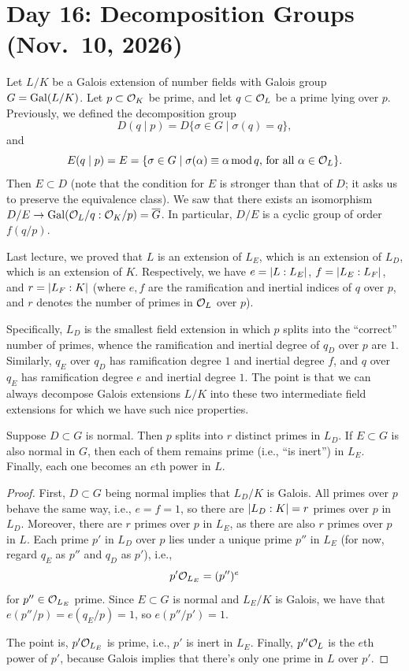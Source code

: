 \section{Day 16: Decomposition Groups (Nov.\ 10, 2026)}
Let $L/K$ be a Galois extension of number fields with Galois group $G = \operatorname{Gal}(L/K)$. Let $p \subset \mathcal O_K$ be prime, and let $q \subset \mathcal O_L$ be a prime lying over $p$. Previously, we defined the decomposition group
\[ D(q \mid p) = D \{\sigma \in G \mid \sigma(q) = q\}, \]
and
\[ E(q \mid p) = E = \{\sigma \in G \mid \sigma(\alpha) \equiv \alpha \operatorname{mod}{q} \text{, for all $\alpha \in \mathcal O_L$}\}. \]
Then $E \subset D$ (note that the condition for $E$ is stronger than that of $D$; it asks us to preserve the equivalence class). We saw that there exists an isomorphism $D/E \to \operatorname{Gal}(\mathcal O_L/q : \mathcal O_K/p) = \overline G$. In particular, $D/E$ is a cyclic group of order $f(q/p)$.

Last lecture, we proved that $L$ is an extension of $L_E$, which is an extension of $L_D$, which is an extension of $K$. Respectively, we have $e = \left\lvert L : L_E \right\rvert$, $f = \left\lvert L_E : L_F \right\rvert$, and $r = \left\lvert L_F : K \right\rvert$ (where $e, f$ are the ramification and inertial indices of $q$ over $p$, and $r$ denotes the number of primes in $\mathcal O_L$ over $p$).

Specifically, $L_D$ is the smallest field extension in which $p$ splits into the ``correct'' number of primes, whence the ramification and inertial degree of $q_D$ over $p$ are $1$. Similarly, $q_E$ over $q_D$ has ramification degree $1$ and inertial degree $f$, and $q$ over $q_E$ has ramification degree $e$ and inertial degree $1$. The point is that we can always decompose Galois extensions $L/K$ into these two intermediate field extensions for which we have such nice properties.

\begin{corollary} \label{cor:splitting_inert_primes}
    Suppose $D \subset G$ is normal. Then $p$ splits into $r$ distinct primes in $L_D$. If $E \subset G$ is also normal in $G$, then each of them remains prime (i.e., ``is inert'') in $L_E$. Finally, each one becomes an $e$th power in $L$.
\end{corollary}
\begin{proof}
    First, $D \subset G$ being normal implies that $L_D / K$ is Galois. All primes over $p$ behave the same way, i.e., $e = f = 1$, so there are $\left\lvert L_D : K \right\rvert = r$ primes over $p$ in $L_D$. Moreover, there are $r$ primes over $p$ in $L_E$, as there are also $r$ primes over $p$ in $L$. Each prime $p'$ in $L_D$ over $p$ lies under a unique prime $p''$ in $L_E$ {\color{amethyst}(for now, regard $q_E$ as $p''$ and $q_D$ as $p'$)}, i.e.,
    \[ p' \mathcal O_{L_E} = (p'')^e \]
    for $p'' \in \mathcal O_{L_E}$ prime. Since $E \subset G$ is normal and $L_E/K$ is Galois, we have that $e(p'' / p) = e(q_E / p) = 1$, so $e(p'' / p') = 1$.

    The point is, $p' \mathcal O_{L_E}$ is prime, i.e., $p'$ is inert in $L_E$. Finally, $p'' \mathcal O_L$ is the $e$th power of $p'$, because Galois implies that there's only one prime in $L$ over $p'$.
\end{proof}

